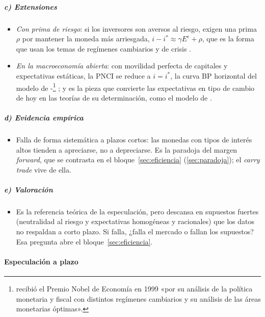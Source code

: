 \documentclass[11pt]{article}
\begin{document}
\subparagraph{c) Extensiones}

\begin{itemize}
\item \emph{Con prima de riesgo}: si los inversores son aversos al riesgo, exigen una prima $\rho$ por mantener la moneda más arriesgada, $i-i^{*}\approx\gamma E^e+\rho$, que es la forma que usan los temas de regímenes cambiarios y de crisis  .
\item \emph{En la macroeconomía abierta}: con movilidad perfecta de capitales y expectativas estáticas, la PNCI se reduce a $i=i^{*}$, la curva BP horizontal del modelo de -\footnote{ recibió el Premio Nobel de Economía en 1999 «por su análisis de la política monetaria y fiscal con distintos regímenes cambiarios y su análisis de las áreas monetarias óptimas»\nocite{Nobel1999Mundell}.} ; y es la pieza que convierte las expectativas en tipo de cambio de hoy en las teorías de su determinación, como el modelo de  .
\end{itemize}

\subparagraph{d) Evidencia empírica}

\begin{itemize}
\item Falla de forma sistemática a plazos cortos: las monedas con tipos de interés altos tienden a apreciarse, no a depreciarse. Es la paradoja del margen \emph{forward}, que se contrasta en el bloque~\ref{sec:eficiencia} (\ref{sec:paradoja}); el \emph{carry trade} vive de ella.
\end{itemize}

\subparagraph{e) Valoración}

\begin{itemize}
\item Es la referencia teórica de la especulación, pero descansa en supuestos fuertes (neutralidad al riesgo y expectativas homogéneas y racionales) que los datos no respaldan a corto plazo. Si falla, ¿falla el mercado o fallan los supuestos? Esa pregunta abre el bloque~\ref{sec:eficiencia}.
\end{itemize}

\paragraph{Especulación a plazo}
\end{document}
